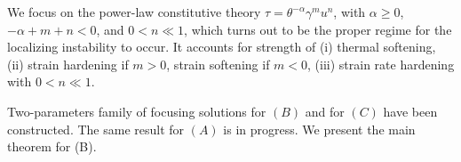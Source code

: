 \documentclass[a4paper,11pt]{article}
\begin{document}
We focus on the power-law constitutive theory $\tau = \theta^{-\alpha}\gamma^m u^n$, with $\alpha\ge0$, $-\alpha+m+n<0$, and $0<n\ll1$, which turns out to be the proper regime for the localizing instability to occur. It accounts for strength of (i) thermal softening, (ii) strain hardening if $m>0$, strain softening if $m<0$, (iii) strain rate hardening with $0<n\ll1$.

Two-parameters family of focusing solutions for $(B)$ and for $(C)$ have been constructed. The same result for $(A)$ is in progress. %
We present the main theorem for (B).
\end{document}
